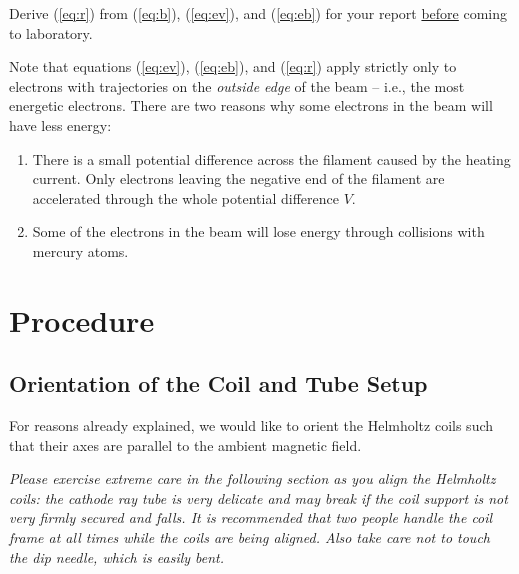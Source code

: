 Derive ({\ref{eq:r}}) from ({\ref{eq:b}}), ({\ref{eq:ev}}), and ({\ref{eq:eb}}) for your report \underline{before} coming to laboratory.\myskip

Note that equations ({\ref{eq:ev}}), ({\ref{eq:eb}}), and ({\ref{eq:r}}) apply strictly only to electrons with trajectories on the \emph{outside edge} of the beam -- i.e., the most energetic electrons. There are two reasons why some electrons in the beam will have less energy:
\begin{enumerate}
\item There is a small potential difference across the filament caused by the heating current. Only electrons leaving the negative end of the filament are accelerated through the whole potential difference $V$.
\item Some of the electrons in the beam will lose energy through collisions with mercury atoms.
\end{enumerate}

\section{Procedure}
\subsection{Orientation of the Coil and Tube Setup}

For reasons already explained, we would like to orient the Helmholtz coils such that their axes are parallel to the ambient magnetic field.\myskip

\emph{Please exercise extreme care in the following section as you align the Helmholtz coils: the cathode ray tube is very delicate and may break if the coil support is not very firmly secured and falls.  It is recommended that two people handle the coil frame at all times while the coils are being aligned.  Also take care not to touch the dip needle, which is easily bent.}\myskip

